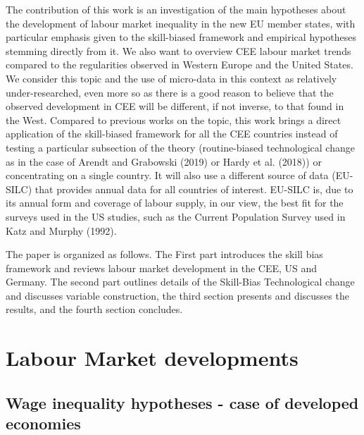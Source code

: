 \documentclass{article}
\begin{document}
The contribution of this work is an investigation of the main hypotheses about the development of labour market inequality in the new EU member states, with particular emphasis given to the skill-biased framework and empirical hypotheses stemming directly from it. We also want to overview CEE labour market trends compared to the regularities observed in Western Europe and the United States. We consider this topic and the use of micro-data in this context as relatively under-researched, even more so as there is a good reason to believe that the observed development in CEE will be different, if not inverse, to that found in the West. Compared to previous works on the topic, this work brings a direct application of the skill-biased framework for all the CEE countries instead of testing a particular subsection of the theory (routine-biased technological change as in the case of Arendt and Grabowski (2019) or Hardy et al. (2018)) or concentrating on a single country. It will also use a different source of data (EU-SILC) that provides annual data for all countries of interest. EU-SILC is, due to its annual form and coverage of labour supply, in our view, the best fit for the surveys used in the US studies, such as the Current Population Survey used in Katz and Murphy (1992). 

The paper is organized as follows. The First part introduces the skill bias framework and reviews labour market development in the CEE, US and Germany. The second part outlines details of the Skill-Bias Technological change and discusses variable construction, the third section presents and discusses the results, and the fourth section concludes.

\section{Labour Market developments}
\subsection{Wage inequality hypotheses - case of developed economies}
\end{document}
